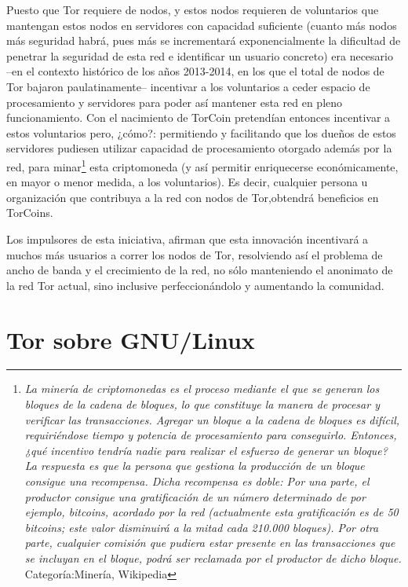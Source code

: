 \documentclass[a4paper, 11pt, titlepage]{article}
\begin{document}
        Puesto que Tor requiere de nodos, y estos nodos requieren de voluntarios que mantengan estos nodos en servidores con 
        capacidad suficiente (cuanto más nodos más seguridad habrá, pues más se incrementará exponencialmente la dificultad 
        de penetrar la seguridad de esta red e identificar un usuario concreto) era necesario --en el contexto histórico de 
        los años 2013-2014, en los que el total de nodos de Tor bajaron paulatinamente-- incentivar a los voluntarios a ceder 
        espacio de procesamiento y servidores para poder así mantener esta red en pleno funcionamiento. Con el nacimiento de 
        TorCoin pretendían entonces incentivar a estos voluntarios pero, ¿cómo?: permitiendo y facilitando que los dueños de 
        estos servidores pudiesen utilizar capacidad de procesamiento otorgado además por la red, para minar\footnote{
        \emph{La minería de criptomonedas es el proceso mediante el que se generan los bloques de la cadena de bloques, lo 
        que constituye la manera de procesar y verificar las transacciones. Agregar un bloque a la cadena de bloques es 
        difícil, requiriéndose tiempo y potencia de procesamiento para conseguirlo. Entonces, ¿qué incentivo tendría nadie 
        para realizar el esfuerzo de generar un bloque? La respuesta es que la persona que gestiona la producción de un 
        bloque consigue una recompensa. Dicha recompensa es doble: Por una parte, el productor consigue una gratificación 
        de un número determinado de por ejemplo, bitcoins, acordado por la red (actualmente esta gratificación es de 50 
        bitcoins; este valor disminuirá a la mitad cada 210.000 bloques). Por otra parte, cualquier comisión que pudiera 
        estar presente en las transacciones que se incluyan en el bloque, podrá ser reclamada por el productor de dicho 
        bloque.} Categoría:Minería, Wikipedia} esta criptomoneda (y así permitir enriquecerse económicamente, en mayor o 
        menor medida, a los voluntarios). Es decir, cualquier persona u organización que contribuya a la red con nodos de 
        Tor,obtendrá beneficios en TorCoins.
        
        Los impulsores de esta iniciativa, afirman que esta innovación incentivará a muchos más usuarios a correr los nodos 
        de Tor, resolviendo así el problema de ancho de banda y el crecimiento de la red, no sólo manteniendo el anonimato
        de la red Tor actual, sino inclusive perfeccionándolo y aumentando la comunidad.
    

\section{Tor sobre GNU/Linux}
\end{document}
